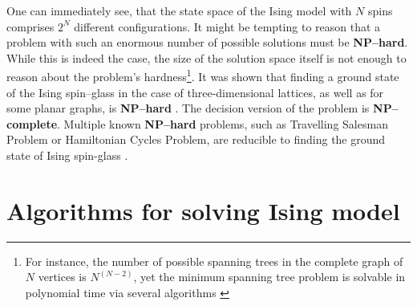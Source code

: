 One can immediately see, that the state space of the Ising model with $N$ spins comprises $2^{N}$
different configurations. It might be tempting to reason that a problem with such an enormous number
of possible solutions must be \textbf{NP--hard}. While this is indeed the case, the size of the
solution space itself is not enough to reason about the problem's hardness\footnote{For instance,
the number of possible spanning trees in the complete graph of $N$ vertices is $N^{(N-2)}$, yet the
minimum spanning tree problem is solvable in polynomial time via several algorithms \cite{clrs}}.
It was shown that finding a ground state of the Ising spin--glass in the case of three-dimensional
lattices, as well as for some planar graphs,  is \textbf{NP--hard} \cite{barahoma}. The decision
version of the problem is \textbf{NP--complete}. Multiple known \textbf{NP--hard} problems, such as
Travelling Salesman Problem or Hamiltonian Cycles Problem, are reducible to finding the ground state of Ising spin-glass \cite{lucas}.

\section{Algorithms for solving Ising model}

